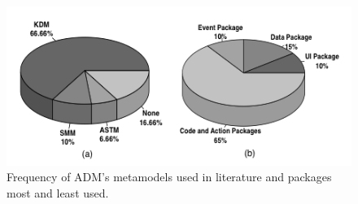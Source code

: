 \begin{figure}[!h]
 \centering
  \includegraphics[scale=0.5]{figuras/todos2}
 \caption{Frequency of ADM's metamodels used in literature and packages most and least used.}
 \label{foo}
\end{figure} 


%


